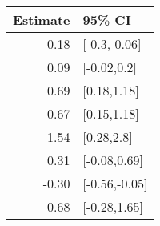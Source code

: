 \begin{tabular}{rl}
  \hline
Estimate & 95\% CI \\ 
  \hline
-0.18 & [-0.3,-0.06] \\ 
  0.09 & [-0.02,0.2] \\ 
  0.69 & [0.18,1.18] \\ 
  0.67 & [0.15,1.18] \\ 
  1.54 & [0.28,2.8] \\ 
  0.31 & [-0.08,0.69] \\ 
  -0.30 & [-0.56,-0.05] \\ 
  0.68 & [-0.28,1.65] \\ 
   \hline
\end{tabular}

